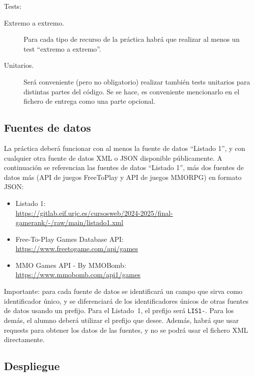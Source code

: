 Tests:

\begin{description}
\item[Extremo a extremo.] Para cada tipo de recurso de la práctica habrá que realizar al menos un test ``extremo a extremo''.
\item[Unitarios.] Será conveniente (pero no obligatorio) realizar también tests unitarios para distintas partes del código. Se se hace, es conveniente mencionarlo en el fichero de entrega como una parte opcional.
\end{description}

\subsection{Fuentes de datos}
\label{sec:practica-2025-05:datos}

La práctica deberá funcionar con al menos la fuente de datos ``Listado 1'', y con cualquier otra fuente de datos XML o JSON disponible públicamente. A continuación se referencian las fuentes de datos ``Listado 1'', más dos fuentes de datos más (API de juegos FreeToPlay y API de juegos MMORPG) en formato JSON:

\begin{itemize}
\item Listado 1: \\
  \url{https://gitlab.eif.urjc.es/cursosweb/2024-2025/final-gamerank/-/raw/main/listado1.xml}
\item Free-To-Play Games Database API: \\
  \url{https://www.freetogame.com/api/games}
\item MMO Games API - By MMOBomb: \\
  \url{https://www.mmobomb.com/api1/games}
\end{itemize}

Importante: para cada fuente de datos se identificará un campo que sirva como identificador único, y se diferenciará de los identificadores únicos de otras fuentes de datos usando un prefijo. Para el Listado~1, el prefijo será \verb|LIS1-|. Para los demás, el alumno deberá utilizar el prefijo que desee. Además, habrá que usar requests para obtener los datos de las fuentes, y no se podrá usar el fichero XML directamente.

\subsection{Despliegue}
\label{sec:practica-2025-05:despliegue}

